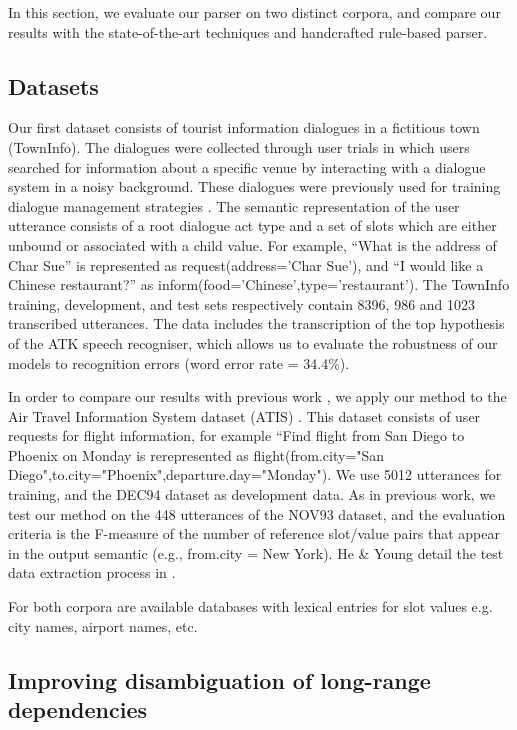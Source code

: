 \documentclass[11pt]{article}
\begin{document}
In this section, we evaluate our parser on two distinct corpora, and compare our results with the state-of-the-art techniques and handcrafted rule-based parser. 

\subsection{Datasets}

Our first dataset consists of tourist information dialogues in a fictitious
town (TownInfo). The dialogues were collected through user
trials in which users searched for information about a specific venue
by interacting with a dialogue system in a noisy background. These
dialogues were previously used for training dialogue management
strategies \cite{williams07,thomson08}. The semantic representation of the user utterance consists of a root dialogue act type and a set of slots which are either
unbound or associated with a child value. For example, ``What is
the address of Char Sue'' is represented as request(address='Char Sue'), and ``I would like a Chinese restaurant?'' as inform(food='Chinese',type='restaurant'). The TownInfo training, development, and test sets respectively contain
8396, 986 and 1023 transcribed utterances.  The data includes the transcription of the top hypothesis of the ATK speech recogniser,
which allows us to evaluate the robustness of our models to recognition
errors (word error rate = 34.4\%). 

In order to compare our results with previous work \cite{he06,zettlemoyer07},
we apply our method to the Air Travel Information System dataset
(ATIS) \cite{atis94}. This dataset consists of user requests for flight information, for example ``Find flight from San Diego to Phoenix on Monday is rerepresented as flight(from.city="San Diego",to.city="Phoenix",departure.day="Monday"). We use 5012 utterances for training, and the DEC94 dataset as development data. As in previous work, we test our method on the 448 utterances of the NOV93 dataset, and the evaluation criteria is the F-measure of the number of reference slot/value pairs that appear in the output semantic (e.g., from.city = New York). He \& Young detail the test data extraction process in \cite{he05}.

For both corpora are available databases with lexical entries for slot values e.g. city names, airport names, etc. 

\subsection{Improving disambiguation of long-range dependencies}
\end{document}
